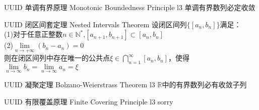 \documentclass[UTF8, 10pt]{ctexart}
\begin{document}
        \begin{thm}
            {UUID}
            {单调有界原理}
            {Monotonic Boundedness Principle}
            {l3}
            单调有界数列必定收敛
        \end{thm}

        \begin{thm}
            {UUID}
            {闭区间套定理}
            {Nested Intervals Theorem}
            设闭区间列$\{[a_n , b_n] \}$满足：\\
            (1)对于任意正整数$n \in \mathbb{N}^*$,$[a_{n+1} , b_{n+1}] \subset [a_n , b_n]$\\
            (2)$\lim\limits_{n \to +\infty} (b_n - a_n) = 0$\\
            则在闭区间列中存在唯一的公共点$\xi \in \bigcap\limits_{n=1}^{\infty}[a_n,b_n]$，使得$\lim\limits_{n \to \infty} b_n = \lim\limits_{n \to \infty} a_n = \xi$
        \end{thm}

        \begin{thm}
            {UUID}
            {凝聚定理}
            {Bolzano-Weierstrass Theorem}
            {l3}
            $\mathbb{R}$中的有界数列必有收敛子列
        \end{thm}

        \begin{thm}
            {UUID}
            {有限覆盖原理}
            {Finite Covering Principle}
            {l3}
            sorry
        \end{thm}
\section{}
\end{document}
